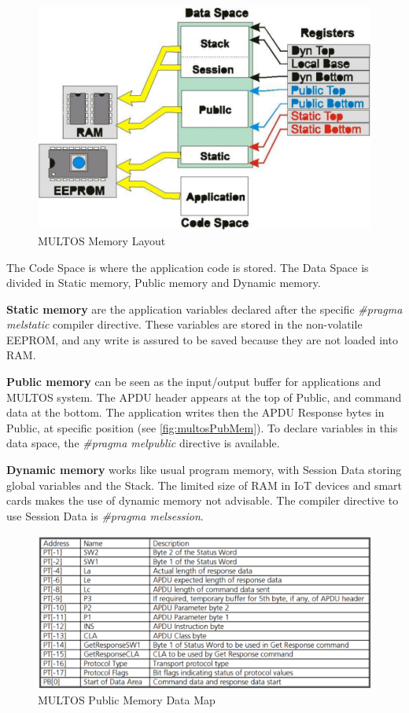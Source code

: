 \begin{figure}[bth]
	\begin{center}
		\includegraphics[width=0.8\linewidth]{gfx/multosMemLay}
	\end{center}
	\caption{MULTOS Memory Layout}
	\label{fig:multosMemLay}
\end{figure}


The Code Space is where the application code is stored.
The Data Space is divided in Static memory, Public memory and Dynamic memory.

\textbf{Static memory} are the application variables declared after the specific \textit{\#pragma melstatic} compiler directive. These variables are stored in the non-volatile EEPROM, and any write is assured to be saved because they are not loaded into RAM.

\textbf{Public memory} can be seen as the input/output buffer for applications and MULTOS system. The APDU header appears at the top of Public, and command data at the bottom. The application writes then the APDU Response bytes in Public, at specific position (see \autoref{fig:multosPubMem}). To declare variables in this data space, the \textit{\#pragma melpublic} directive is available.

\textbf{Dynamic memory} works like usual program memory, with Session Data storing global variables and the Stack. The limited size of RAM in IoT devices and smart cards makes the use of dynamic memory not advisable. The compiler directive to use Session Data is \textit{\#pragma melsession}.


\begin{figure}[bth]
	\begin{center}
		\includegraphics[width=\linewidth]{gfx/multosPubMem}
	\end{center}
	\caption{MULTOS Public Memory Data Map}
	\label{fig:multosPubMem}
\end{figure}


